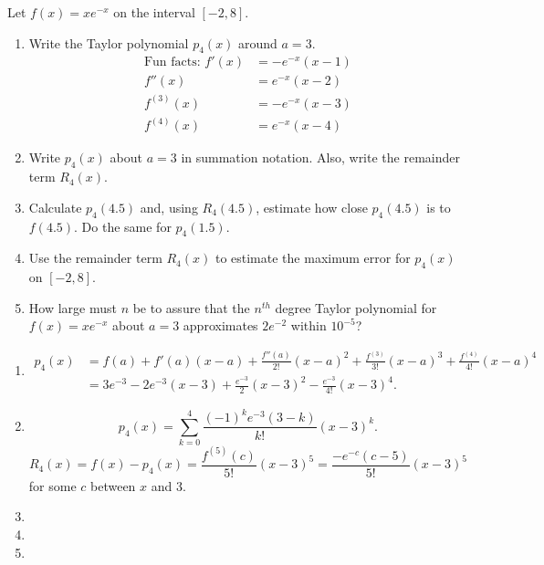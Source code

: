 \documentclass[handout]{ximera}
\begin{document}
\begin{problem}
Let $f(x) = xe^{-x}$ on the interval $[-2,8]$.  
	\begin{enumerate}
	
	\item  Write the Taylor polynomial $p_4(x)$ around $a=3$.
		\begin{align*}
		\text{Fun facts: } f'(x) &= -e^{-x}(x-1)  \\
		f''(x) &= e^{-x} (x-2) \\
		f^{(3)}(x) &= -e^{-x} (x-3) \\
		f^{(4)}(x) &= e^{-x} (x-4) 
		\end{align*}
	
	\item  Write $p_4(x)$ about $a=3$ in summation notation.  
	Also, write the remainder term $R_4(x)$.  
	
	\item  Calculate $p_4(4.5)$ and, using $R_4(4.5)$, estimate how close $p_4(4.5)$ is to $f(4.5)$.  
	Do the same for $p_4(1.5)$.  
	
	\item  Use the remainder term $R_4(x)$ to estimate the maximum error for $p_4(x)$ on $[-2,8]$.
	
	\item  How large must $n$ be to assure that the $n^{th}$ degree Taylor polynomial for $f(x) = xe^{-x}$ about $a=3$ approximates $2e^{-2}$ within $10^{-5}$?
	
	\end{enumerate}
	
	\begin{freeResponse}
	\begin{enumerate}
	
	\item  
		\begin{align*}
		p_4(x) &= f(a) + f'(a)(x-a) + \frac{f''(a)}{2!}(x-a)^2 + \frac{f^{(3)}}{3!}(x-a)^3 + \frac{f^{(4)}}{4!}(x-a)^4  \\
		&= 3e^{-3} -2e^{-3}(x-3) + \frac{e^{-3}}{2}(x-3)^2 - \frac{e^{-3}}{4!}(x-3)^4.
		\end{align*}
	
	\item  
		\[
		p_4(x) = \sum_{k=0}^4 \frac{(-1)^k e^{-3} (3-k)}{k!}(x-3)^k.
		\]
		\[
		R_4(x) = f(x)-p_4(x) = \frac{f^{(5)}(c)}{5!}(x-3)^5 = \frac{-e^{-c} (c-5)}{5!}(x-3)^5
		\]
	for some $c$ between $x$ and $3$.
	
	\item  
	
	\item  
	
	\item  
	
	\end{enumerate}
	\end{freeResponse}

\end{problem}
\end{document}
